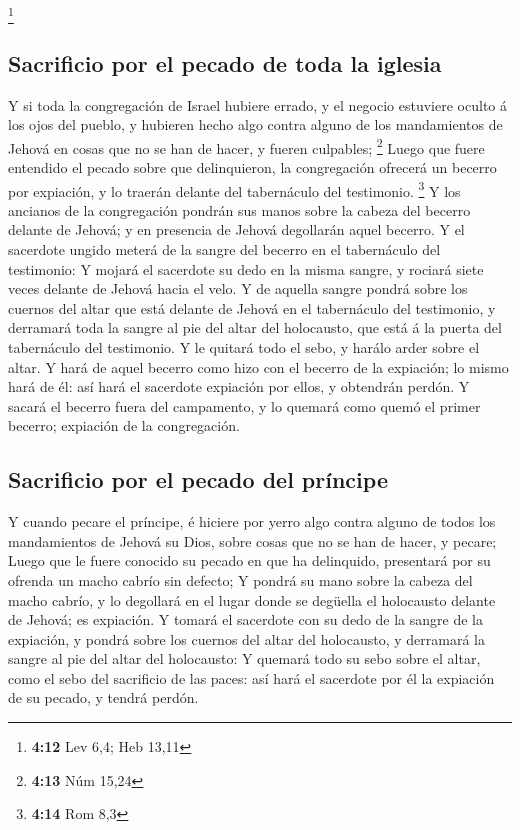 \footnote{\textbf{4:12} Lev 6,4; Heb 13,11}

\hypertarget{sacrificio-por-el-pecado-de-toda-la-iglesia}{%
\subsection{Sacrificio por el pecado de toda la
iglesia}\label{sacrificio-por-el-pecado-de-toda-la-iglesia}}

 Y si toda la congregación de Israel hubiere errado, y el
negocio estuviere oculto á los ojos del pueblo, y hubieren hecho algo
contra alguno de los mandamientos de Jehová en cosas que no se han de
hacer, y fueren culpables; \footnote{\textbf{4:13} Núm 15,24}
 Luego que fuere entendido el pecado sobre que
delinquieron, la congregación ofrecerá un becerro por expiación, y lo
traerán delante del tabernáculo del testimonio. \footnote{\textbf{4:14}
  Rom 8,3}  Y los ancianos de la congregación pondrán sus
manos sobre la cabeza del becerro delante de Jehová; y en presencia de
Jehová degollarán aquel becerro.  Y el sacerdote ungido
meterá de la sangre del becerro en el tabernáculo del testimonio:
 Y mojará el sacerdote su dedo en la misma sangre, y
rociará siete veces delante de Jehová hacia el velo.  Y de
aquella sangre pondrá sobre los cuernos del altar que está delante de
Jehová en el tabernáculo del testimonio, y derramará toda la sangre al
pie del altar del holocausto, que está á la puerta del tabernáculo del
testimonio.  Y le quitará todo el sebo, y harálo arder
sobre el altar.  Y hará de aquel becerro como hizo con el
becerro de la expiación; lo mismo hará de él: así hará el sacerdote
expiación por ellos, y obtendrán perdón.  Y sacará el
becerro fuera del campamento, y lo quemará como quemó el primer becerro;
expiación de la congregación.

\hypertarget{sacrificio-por-el-pecado-del-pruxedncipe}{%
\subsection{Sacrificio por el pecado del
príncipe}\label{sacrificio-por-el-pecado-del-pruxedncipe}}

 Y cuando pecare el príncipe, é hiciere por yerro algo
contra alguno de todos los mandamientos de Jehová su Dios, sobre cosas
que no se han de hacer, y pecare;  Luego que le fuere
conocido su pecado en que ha delinquido, presentará por su ofrenda un
macho cabrío sin defecto;  Y pondrá su mano sobre la cabeza
del macho cabrío, y lo degollará en el lugar donde se degüella el
holocausto delante de Jehová; es expiación.  Y tomará el
sacerdote con su dedo de la sangre de la expiación, y pondrá sobre los
cuernos del altar del holocausto, y derramará la sangre al pie del altar
del holocausto:  Y quemará todo su sebo sobre el altar,
como el sebo del sacrificio de las paces: así hará el sacerdote por él
la expiación de su pecado, y tendrá perdón.

